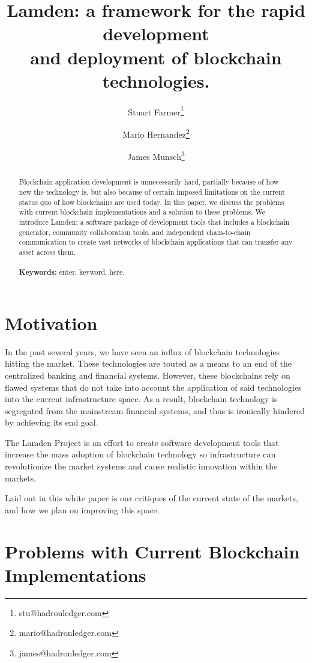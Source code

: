 \documentclass{%
	article}
\title{Lamden: a framework for the rapid development\\and deployment of blockchain technologies.}
\author{Stuart Farmer\thanks{stu@hadronledger.com}}
\author{Mario Hernandez\thanks{mario@hadronledger.com}}
\author{James Munsch\thanks{james@hadronledger.com}}
\affil{The Lamden Project, White Paper version 0.1.1}
\begin{document}
\sloppy

\begin{titlingpage}
    \maketitle
    \begin{abstract}
	Blockchain application development is unnecessarily hard, partially because of how new the technology is, but also because of certain imposed limitations on the current status quo of how blockchains are used today. In this paper, we discuss the problems with current blockchain implementations and a solution to these problems. We introduce Lamden: a software package of development tools that includes a blockchain generator, community collaboration tools, and independent chain-to-chain communication to create vast networks of blockchain applications that can transfer any asset across them.\\\\
	{\bf Keywords:} enter, keyword, here.
    \end{abstract}
\end{titlingpage}

\section{Motivation}

In the past several years, we have seen an influx of blockchain technologies hitting the market. These technologies are touted as a means to an end of the centralized banking and financial systems. However, these blockchains rely on flawed systems that do not take into account the application of said technologies into the current infrastructure space. As a result, blockchain technology is segregated from the mainstream financial systems, and thus is ironically hindered by achieving its end goal.

The Lamden Project is an effort to create software development tools that increase the mass adoption of blockchain technology so infrastructure can revolutionize the market systems and cause realistic innovation within the markets.

Laid out in this white paper is our critiques of the current state of the markets, and how we plan on improving this space.

\section{Problems with Current Blockchain\\ Implementations}
\end{document}
